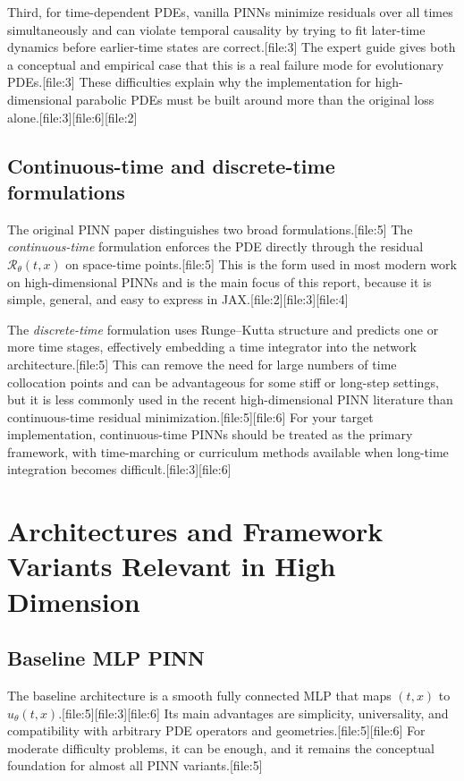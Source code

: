 \documentclass[11pt]{report}
\begin{document}
Third, for time-dependent PDEs, vanilla PINNs minimize residuals over all times simultaneously and can violate temporal causality by trying to fit later-time dynamics before earlier-time states are correct.[file:3]  
The expert guide gives both a conceptual and empirical case that this is a real failure mode for evolutionary PDEs.[file:3]  
These difficulties explain why the implementation for high-dimensional parabolic PDEs must be built around more than the original loss alone.[file:3][file:6][file:2]

\section{Continuous-time and discrete-time formulations}

The original PINN paper distinguishes two broad formulations.[file:5]  
The \emph{continuous-time} formulation enforces the PDE directly through the residual \(\mathcal{R}_\theta(t,x)\) on space-time points.[file:5]  
This is the form used in most modern work on high-dimensional PINNs and is the main focus of this report, because it is simple, general, and easy to express in JAX.[file:2][file:3][file:4]

The \emph{discrete-time} formulation uses Runge--Kutta structure and predicts one or more time stages, effectively embedding a time integrator into the network architecture.[file:5]  
This can remove the need for large numbers of time collocation points and can be advantageous for some stiff or long-step settings, but it is less commonly used in the recent high-dimensional PINN literature than continuous-time residual minimization.[file:5][file:6]  
For your target implementation, continuous-time PINNs should be treated as the primary framework, with time-marching or curriculum methods available when long-time integration becomes difficult.[file:3][file:6]

\chapter{Architectures and Framework Variants Relevant in High Dimension}

\section{Baseline MLP PINN}

The baseline architecture is a smooth fully connected MLP that maps \((t,x)\) to \(u_\theta(t,x)\).[file:5][file:3][file:6]  
Its main advantages are simplicity, universality, and compatibility with arbitrary PDE operators and geometries.[file:5][file:6]  
For moderate difficulty problems, it can be enough, and it remains the conceptual foundation for almost all PINN variants.[file:5]
\end{document}
